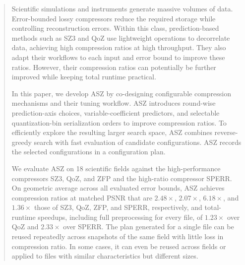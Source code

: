 \begin{abstract}
Scientific simulations and instruments generate massive volumes of data. Error-bounded lossy compressors reduce the required storage while controlling reconstruction errors. Within this class, prediction-based methods such as SZ3 and QoZ use lightweight operations to decorrelate data, achieving high compression ratios at high throughput. They also adapt their workflows to each input and error bound to improve these ratios. However, their compression ratios can potentially be further improved while keeping total runtime practical.

In this paper, we develop ASZ by co-designing configurable compression mechanisms and their tuning workflow. ASZ introduces round-wise prediction-axis choices, variable-coefficient predictors, and selectable quantization-bin serialization orders to improve compression ratios. To efficiently explore the resulting larger search space, ASZ combines reverse-greedy search with fast evaluation of candidate configurations. ASZ records the selected configurations in a configuration plan.

We evaluate ASZ on 18 scientific fields against the high-performance compressors SZ3, QoZ, and ZFP and the high-ratio compressor SPERR. On geometric average across all evaluated error bounds, ASZ achieves compression ratios at matched PSNR that are $2.48\times$, $2.07\times$, $6.18\times$, and $1.36\times$ those of SZ3, QoZ, ZFP, and SPERR, respectively, and total-runtime speedups, including full preprocessing for every file, of $1.23\times$ over QoZ and $2.33\times$ over SPERR. The plan generated for a single file can be reused repeatedly across snapshots of the same field with little loss in compression ratio. In some cases, it can even be reused across fields or applied to files with similar characteristics but different sizes.
\end{abstract}
